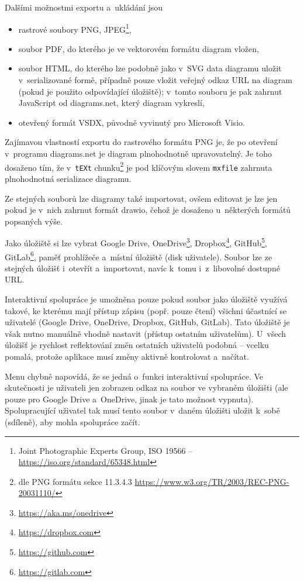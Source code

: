 Dalšími možnostmi exportu a~ukládání jsou
\begin{itemize}
  \item rastrové soubory PNG, JPEG\footnote{Joint Photographic Experts Group, ISO 19566 -- \url{https://iso.org/standard/65348.html}},
  \item soubor PDF, do kterého je ve vektorovém formátu diagram vložen,
  \item soubor HTML, do kterého lze podobně jako v~SVG data diagramu uložit v~serializované formě, případně pouze vložit veřejný odkaz URL na diagram (pokud je použito odpovídající úložiště);
        v~tomto souboru je pak zahrnut JavaScript od diagrams.net, který diagram vykreslí,
  \item otevřený formát VSDX, původně vyvinutý pro Microsoft Visio.
\end{itemize}

Zajímavou vlastností exportu do rastrového formátu PNG je, že po otevření v~programu diagrams.net je diagram plnohodnotně upravovatelný.
Je toho dosaženo tím, že v~\texttt{tEXt} chunku\footnote{dle PNG formátu sekce 11.3.4.3 \url{https://www.w3.org/TR/2003/REC-PNG-20031110/}}
je pod klíčovým slovem \texttt{mxfile} zahrnuta plnohodnotná serializace diagramu.

Ze stejných souborů lze diagramy také importovat, ovšem editovat je lze jen pokud je v~nich zahrnut formát drawio, čehož je dosaženo u~některých formátů popsaných výše.

Jako úložiště si lze vybrat Google Drive,
OneDrive\footnote{\url{https://aka.ms/onedrive}},
Dropbox\footnote{\url{https://dropbox.com}},
GitHub\footnote{\url{https://github.com}},
Git\-Lab\footnote{\url{https://gitlab.com}},
paměť prohlížeče a~místní úložiště (disk uživatele).
Soubor lze ze stejných úložišť i~otevřít a~importovat, navíc k~tomu i~z~libovolné dostupné URL.

Interaktivní spolupráce je umožněna pouze pokud soubor jako úložiště využívá takové, ke kterému mají přístup zápisu (popř. pouze čtení) všichni účastnící se uživatelé (Google Drive, OneDrive, Dropbox, GitHub, GitLab).
Tato úložiště je však nutno manuálně vhodně nastavit (přístup ostatním uživatelům).
U~všech úložišť je rychlost reflektování změn ostatních uživatelů podobná -- vcelku pomalá, protože aplikace musí změny aktivně kontrolovat a~načítat.

Menu  chybně napovídá, že se jedná o~funkci interaktivní spolupráce.
Ve skutečnosti je uživateli jen zobrazen odkaz na soubor ve vybraném úložišti (ale pouze pro Google Drive a~OneDrive, jinak je tato možnost vypnuta).
Spolupracující uživatel tak musí tento soubor v~daném úložišti uložit k~sobě (sdíleně), aby mohla spolupráce začít.

